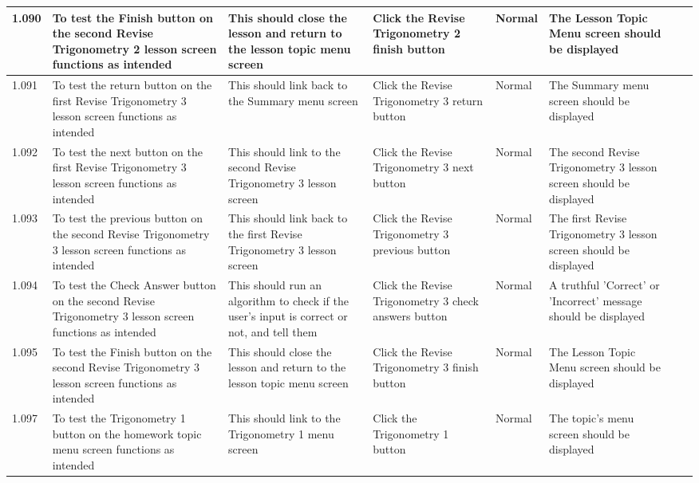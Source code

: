 \begin{landscape}
\begin{center}
\begin{longtable}{|p{1.5cm}|p{2.5cm}|p{2.5cm}|p{2cm}|p{2cm}|p{2cm}|p{2cm}|p{2cm}|}
1.090 & To test the Finish button on the second Revise Trigonometry 2 lesson screen functions as intended & This should close the lesson and return to the lesson topic menu screen & Click the Revise Trigonometry 2 finish button & Normal & The Lesson Topic Menu screen should be displayed & & \\ \hline
1.091 & To test the return button on the first Revise Trigonometry 3 lesson screen functions as intended & This should link back to the Summary menu screen & Click the Revise Trigonometry 3 return button & Normal & The Summary menu screen should be displayed & & \\ \hline
1.092 & To test the next button on the first Revise Trigonometry 3 lesson screen functions as intended & This should link to the second Revise Trigonometry 3 lesson screen & Click the Revise Trigonometry 3 next button & Normal & The second Revise Trigonometry 3 lesson screen should be displayed & & \\ \hline
1.093 & To test the previous button on the second Revise Trigonometry 3 lesson screen functions as intended & This should link back to the first Revise Trigonometry 3 lesson screen & Click the Revise Trigonometry 3 previous button & Normal & The first Revise Trigonometry 3 lesson screen should be displayed & & \\ \hline
1.094 & To test the Check Answer button on the second Revise Trigonometry 3 lesson screen functions as intended & This should run an algorithm to check if the user's input is correct or not, and tell them & Click the Revise Trigonometry 3 check answers button & Normal & A truthful 'Correct' or 'Incorrect' message should be displayed & & \\ \hline
1.095 & To test the Finish button on the second Revise Trigonometry 3 lesson screen functions as intended & This should close the lesson and return to the lesson topic menu screen & Click the Revise Trigonometry 3 finish button & Normal & The Lesson Topic Menu screen should be displayed & & \\ \hline
1.097 & To test the Trigonometry 1 button on the homework topic menu screen functions as intended & This should link to the Trigonometry 1 menu screen & Click the Trigonometry 1 button & Normal & The topic's menu screen should be displayed & & \\ \hline

\end{longtable}
\end{center}
\end{landscape}
